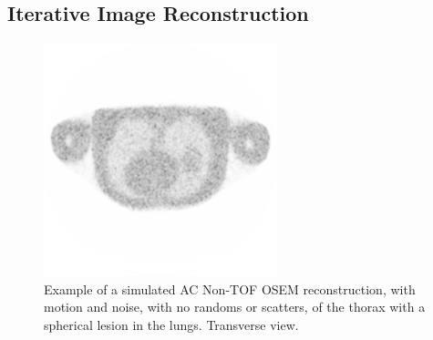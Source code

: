         \subsection{Iterative Image Reconstruction} \label{sec:iterative_image_reconstruction}
            \begin{figure}
                \centering
                
                \includegraphics[width=1.0\linewidth]{figures/background_osem_example.png}
                
                \captionsetup{singlelinecheck=false, justification=raggedright}
                \caption{Example of a simulated \gls{AC} \gls{Non-TOF} \gls{OSEM} reconstruction, with motion and noise, with no randoms or scatters, of the thorax with a spherical lesion in the lungs. Transverse view.}
                \label{fig:iterative_image_reconstruction_osem_example}
            \end{figure}
            


